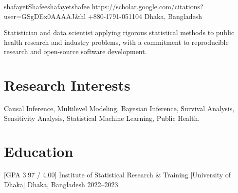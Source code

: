 \documentclass[letterpaper,11pt]{article}
\begin{document}


           {shafayetShafee}{shafayetshafee}
           {https://scholar.google.com/citations?user=GSgDEx0AAAAJ&hl}
           {+880-1791-051104}
           {Dhaka, Bangladesh}



\vspace{15pt}

Statistician and data scientist applying rigorous statistical methods to public
health research and industry problems, with a commitment to reproducible research
and open-source software development.

\vspace{-2pt}


\section*{Research Interests}

Causal Inference, Multilevel Modeling, Bayesian Inference, Survival Analysis,
Sensitivity Analysis, Statistical Machine Learning, Public Health.



\section*{Education}

[GPA 3.97 / 4.00]
{Institute of Statistical Research \& Training}
[University of Dhaka]
{Dhaka, Bangladesh}
{2022--2023}
\end{document}
